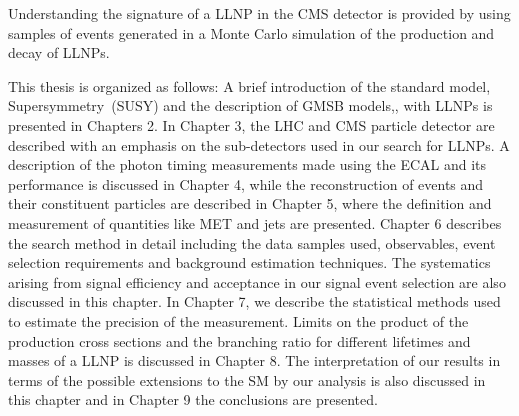 \par 
Understanding the signature of a LLNP in the CMS detector is provided by using samples of events generated in a Monte Carlo simulation of the production and decay of LLNPs.
\par
This thesis is organized as follows: A brief introduction of the standard model, Supersymmetry~(SUSY) and the description of GMSB models,\cite{GMSB}, with LLNPs is presented in Chapters 2. 
\newline 
In Chapter 3, the LHC and CMS particle detector are described with an emphasis on the sub-detectors used in our search for LLNPs. 
\newline 
A description of the photon timing measurements made using the ECAL and its performance is discussed in Chapter 4, while the reconstruction  of events and their constituent particles are described in Chapter 5, where the definition and measurement of quantities like MET and jets are presented. 
\newline 
Chapter 6 describes the search method in detail including the data samples used, observables, event selection requirements and background estimation techniques. The systematics arising from signal efficiency and acceptance in our signal event selection are also discussed in this chapter. In Chapter 7, we describe the statistical methods used to estimate the precision of the measurement.
\newline
Limits on the product of the production cross sections and the branching ratio for different lifetimes and masses of a LLNP is discussed in Chapter 8. The interpretation of our results in terms of the possible extensions to the SM by our analysis is also discussed in this chapter and in Chapter 9 the conclusions are presented.
\label{intro_chapter}
